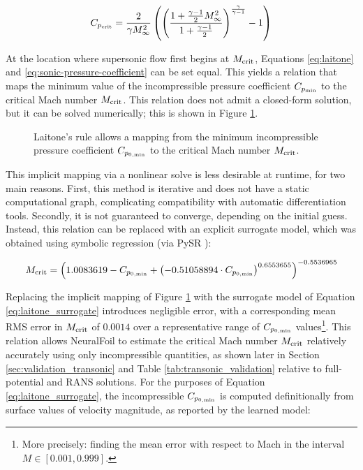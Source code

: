 \documentclass[journal]{new-aiaa}
\begin{document}
\begin{equation}
    C_{p_{\rm crit}} = \frac{2}{\gamma M_\infty^{2}} \left(
    \left(
    \frac{1 + \frac{\gamma - 1}{2} M_\infty^{2}}{1 + \frac{\gamma - 1}{2}}
    \right)^{\frac{\gamma}{\gamma - 1}}
    - 1
    \right)
    \label{eq:sonic-pressure-coefficient}
\end{equation}

At the location where supersonic flow first begins at $M_{\rm crit}$, Equations \ref{eq:laitone} and \ref{eq:sonic-pressure-coefficient} can be set equal. This yields a relation that maps the minimum value of the incompressible pressure coefficient $C_{p_{\rm min}}$ to the critical Mach number $M_{\rm crit}$. This relation does not admit a closed-form solution, but it can be solved numerically; this is shown in Figure \ref{fig:compressibility_corrections}.

\begin{figure}[h]
    \centering
    
    \caption{Laitone's rule allows a mapping from the minimum incompressible pressure coefficient $C_{p_{0,\rm min}}$ to the critical Mach number $M_{\rm crit}$.}
    \label{fig:compressibility_corrections}
\end{figure}

This implicit mapping via a nonlinear solve is less desirable at runtime, for two main reasons. First, this method is iterative and does not have a static computational graph, complicating compatibility with automatic differentiation tools. Secondly, it is not guaranteed to converge, depending on the initial guess. Instead, this relation can be replaced with an explicit surrogate model, which was obtained using symbolic regression (via PySR \cite{cranmerInterpretableMachineLearning2023}):

\begin{equation}
    M_{\rm crit} = \left(
    1.0083619
    - C_{p_{0,\rm min}}
    + \left(-0.51058894 \cdot C_{p_{0,\rm min}} \right)^{0.6553655}
    \right)^{-0.5536965}
    \label{eq:laitone_surrogate}
\end{equation}

Replacing the implicit mapping of Figure \ref{fig:compressibility_corrections} with the surrogate model of Equation \ref{eq:laitone_surrogate} introduces negligible error, with a corresponding mean RMS error in $M_{\rm crit}$ of $0.0014$ over a representative range of $C_{p_{0,\rm min}}$ values\footnote{More precisely: finding the mean error with respect to Mach in the interval $M\in[0.001, 0.999]$.}. This relation allows NeuralFoil to estimate the critical Mach number $M_{\rm crit}$ relatively accurately using only incompressible quantities, as shown later in Section \ref{sec:validation_transonic} and Table \ref{tab:transonic_validation} relative to full-potential and RANS solutions. For the purposes of Equation \ref{eq:laitone_surrogate}, the incompressible $C_{p_{0,\rm min}}$ is computed definitionally from surface values of velocity magnitude, as reported by the learned model:
\end{document}
